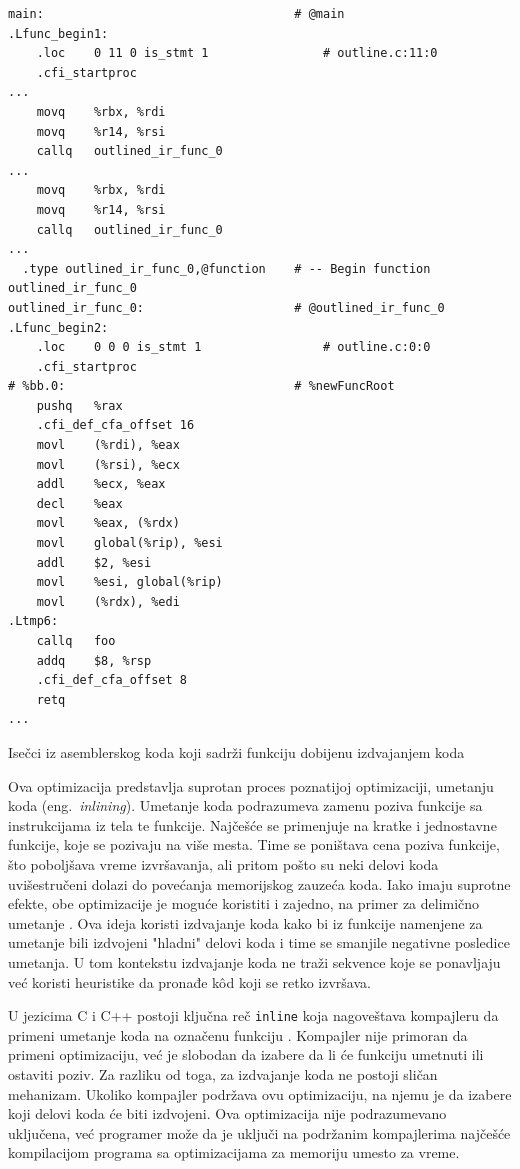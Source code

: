 \documentclass[12pt,oneside]{memoir}
\begin{document}
\begin{listing}[!ht]
\begin{verbatim}
main:                                   # @main
.Lfunc_begin1:
	.loc	0 11 0 is_stmt 1                # outline.c:11:0
	.cfi_startproc
...
	movq	%rbx, %rdi
	movq	%r14, %rsi
	callq	outlined_ir_func_0
...
	movq	%rbx, %rdi
	movq	%r14, %rsi
	callq	outlined_ir_func_0
...
  .type	outlined_ir_func_0,@function    # -- Begin function outlined_ir_func_0
outlined_ir_func_0:                     # @outlined_ir_func_0
.Lfunc_begin2:
	.loc	0 0 0 is_stmt 1                 # outline.c:0:0
	.cfi_startproc
# %bb.0:                                # %newFuncRoot
	pushq	%rax
	.cfi_def_cfa_offset 16
	movl	(%rdi), %eax
	movl	(%rsi), %ecx
	addl	%ecx, %eax
	decl	%eax
	movl	%eax, (%rdx)
	movl	global(%rip), %esi
	addl	$2, %esi
	movl	%esi, global(%rip)
	movl	(%rdx), %edi
.Ltmp6:
	callq	foo
	addq	$8, %rsp
	.cfi_def_cfa_offset 8
	retq
...
\end{verbatim}
\caption{Isečci iz asemblerskog koda koji sadrži funkciju dobijenu izdvajanjem koda}
\label{lst:outline_program_asm}
\end{listing}

Ova optimizacija predstavlja suprotan proces poznatijoj optimizaciji, umetanju koda (eng.~{\em inlining}).
Umetanje koda podrazumeva zamenu poziva funkcije sa instrukcijama iz tela te funkcije.
Najčešće se primenjuje na kratke i jednostavne funkcije, koje se pozivaju na više mesta.
Time se poništava cena poziva funkcije, što poboljšava vreme izvršavanja, ali pritom pošto su neki delovi koda uvišestručeni dolazi do povećanja memorijskog zauzeća koda.
Iako imaju suprotne efekte, obe optimizacije je moguće koristiti i zajedno, na primer za delimično umetanje \cite{Zhao2005FunctionOA}.
Ova ideja koristi izdvajanje koda kako bi iz funkcije namenjene za umetanje bili izdvojeni "hladni" delovi koda i time se smanjile negativne posledice umetanja.
U tom kontekstu izdvajanje koda ne traži sekvence koje se ponavljaju već koristi heuristike da pronađe k\^od koji se retko izvršava.

U jezicima C i C++ postoji ključna reč \verb|inline| koja nagoveštava kompajleru da primeni umetanje koda na označenu funkciju \cite{ISO:C99}.
Kompajler nije primoran da primeni optimizaciju, već je slobodan da izabere da li će funkciju umetnuti ili ostaviti poziv.
Za razliku od toga, za izdvajanje koda ne postoji sličan mehanizam.
Ukoliko kompajler podržava ovu optimizaciju, na njemu je da izabere koji delovi koda će biti izdvojeni.
Ova optimizacija nije podrazumevano uključena, već programer može da je uključi na podržanim kompajlerima najčešće kompilacijom programa sa optimizacijama za memoriju umesto za vreme.
\end{document}
